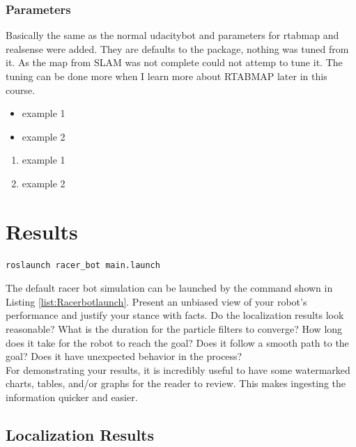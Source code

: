 \documentclass[10pt,journal,compsoc]{IEEEtran}
\begin{document}
\subsubsection{Parameters}
Basically the same as the normal udacitybot and parameters for rtabmap and realsense were added. They are defaults to the package, nothing was tuned from it. 
As the map from SLAM was not complete could not attemp to tune it. The tuning can be done more when I learn more about RTABMAP later in this course.
\begin{itemize}
      \item example 1
      \item example 2
      \end {itemize}
      
      \begin{enumerate}
      \item example 1
      \item example 2
      \end{enumerate}

\section{Results}

\begin{lstlisting}[language={[Sharp]C}, caption={racerbot launch command},label={list:Racerbotlaunch}]
      roslaunch racer_bot main.launch
\end{lstlisting}
The default racer bot simulation can be launched by the command shown in Listing \ref{list:Racerbotlaunch}.
Present an unbiased view of your robot's performance and justify your stance with facts. Do the localization results look reasonable? What is the duration for the particle filters to converge? How long does it take for the robot to reach the goal? Does it follow a smooth path to the goal? Does it have unexpected behavior in the process? \\
For demonstrating your results, it is incredibly useful to have some watermarked charts, tables, and/or graphs for the reader to review. This makes ingesting the information quicker and easier.
\subsection{Localization Results}
\end{document}
